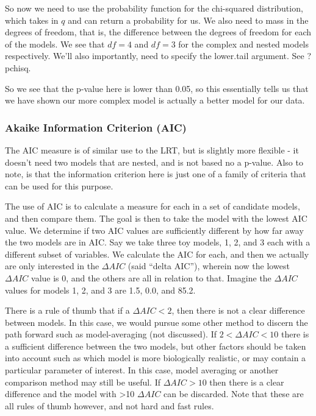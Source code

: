 \documentclass[
]{article}
\begin{document}
So now we need to use the probability function for the chi-squared
distribution, which takes in \(q\) and can return a probability for us.
We also need to mass in the degrees of freedom, that is, the difference
between the degrees of freedom for each of the models. We see that
\(df = 4\) and \(df = 3\) for the complex and nested models
respectively. We'll also importantly, need to specify the lower.tail
argument. See ?pchisq.

So we see that the p-value here is lower than 0.05, so this essentially
tells us that we have shown our more complex model is actually a better
model for our data.

\hypertarget{akaike-information-criterion-aic}{%
\subsubsection{Akaike Information Criterion
(AIC)}\label{akaike-information-criterion-aic}}

The AIC measure is of similar use to the LRT, but is slightly more
flexible - it doesn't need two models that are nested, and is not based
no a p-value. Also to note, is that the information criterion here is
just one of a family of criteria that can be used for this purpose.

The use of AIC is to calculate a measure for each in a set of candidate
models, and then compare them. The goal is then to take the model with
the lowest AIC value. We determine if two AIC values are sufficiently
different by how far away the two models are in AIC. Say we take three
toy models, 1, 2, and 3 each with a different subset of variables. We
calculate the AIC for each, and then we actually are only interested in
the \(\Delta AIC\) (said ``delta AIC''), wherein now the lowest
\(\Delta AIC\) value is 0, and the others are all in relation to that.
Imagine the \(\Delta AIC\) values for models 1, 2, and 3 are 1.5, 0.0,
and 85.2.

There is a rule of thumb that if a \(\Delta AIC < 2\), then there is not
a clear difference between models. In this case, we would pursue some
other method to discern the path forward such as model-averaging (not
discussed). If \(2 < \Delta AIC < 10\) there is a sufficient difference
between the two models, but other factors should be taken into account
such as which model is more biologically realistic, or may contain a
particular parameter of interest. In this case, model averaging or
another comparison method may still be useful. If \(\Delta AIC > 10\)
then there is a clear difference and the model with \textgreater10
\(\Delta AIC\) can be discarded. Note that these are all rules of thumb
however, and not hard and fast rules.
\end{document}
